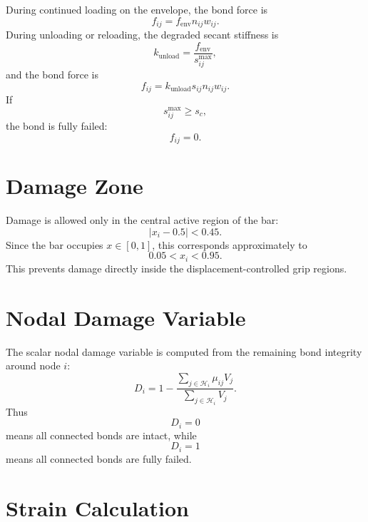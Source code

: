 \documentclass[11pt]{article}
\begin{document}
During continued loading on the envelope, the bond force is
\begin{equation}
f_{ij}
=
f_{\mathrm{env}} n_{ij} w_{ij}.
\end{equation}
During unloading or reloading, the degraded secant stiffness is
\begin{equation}
k_{\mathrm{unload}}
=
\frac{f_{\mathrm{env}}}{s_{ij}^{\max}},
\end{equation}
and the bond force is
\begin{equation}
f_{ij}
=
k_{\mathrm{unload}}s_{ij}n_{ij}w_{ij}.
\end{equation}
If
\begin{equation}
s_{ij}^{\max}\ge s_c,
\end{equation}
the bond is fully failed:
\begin{equation}
f_{ij}=0.
\end{equation}

\section{Damage Zone}

Damage is allowed only in the central active region of the bar:
\begin{equation}
|x_i-0.5| < 0.45.
\end{equation}
Since the bar occupies \(x\in[0,1]\), this corresponds approximately to
\begin{equation}
0.05 < x_i < 0.95.
\end{equation}
This prevents damage directly inside the displacement-controlled grip regions.

\section{Nodal Damage Variable}

The scalar nodal damage variable is computed from the remaining bond integrity around node \(i\):
\begin{equation}
D_i
=
1
-
\frac{
\sum_{j\in\mathcal{H}_i}\mu_{ij}V_j
}{
\sum_{j\in\mathcal{H}_i}V_j
}.
\end{equation}
Thus
\begin{equation}
D_i=0
\end{equation}
means all connected bonds are intact, while
\begin{equation}
D_i=1
\end{equation}
means all connected bonds are fully failed.

\section{Strain Calculation}
\end{document}
